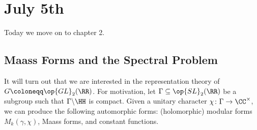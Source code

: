 \documentclass{article}
\begin{document}
\section{July 5th}

Today we move on to chapter 2.

\subsection{Maass Forms and the Spectral Problem}
It will turn out that we are interested in the representation theory of $G\coloneqq\op{GL}_2(\RR)$. For motivation, let $\Gamma\subseteq\op{SL}_2(\RR)$ be a subgroup such that $\Gamma\backslash\HH$ is compact. Given a unitary character $\chi\colon\Gamma\to\CC^\times$, we can produce the following automorphic forms: (holomorphic) modular forms $M_k(\gamma,\chi)$, Maass forms, and constant functions.
\end{document}
